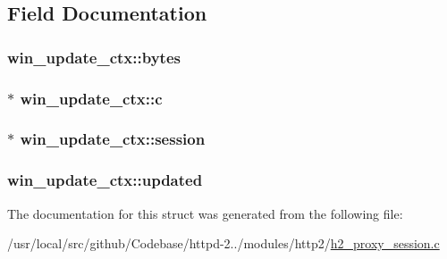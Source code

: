 \subsection{Field Documentation}
\subsubsection[{\texorpdfstring{bytes}{bytes}}]{ win\+\_\+update\+\_\+ctx\+::bytes}\hypertarget{structwin__update__ctx_afa6a82a253225a8e1df7e9de2e55ea28}{}\label{structwin__update__ctx_afa6a82a253225a8e1df7e9de2e55ea28}
\subsubsection[{\texorpdfstring{c}{c}}]{$\ast$ win\+\_\+update\+\_\+ctx\+::c}\hypertarget{structwin__update__ctx_a93823ecffa2e0f63b3d4f07fb62ca406}{}\label{structwin__update__ctx_a93823ecffa2e0f63b3d4f07fb62ca406}
\subsubsection[{\texorpdfstring{session}{session}}]{$\ast$ win\+\_\+update\+\_\+ctx\+::session}\hypertarget{structwin__update__ctx_ae5bfe28fc96917de0833f68cdef78bbc}{}\label{structwin__update__ctx_ae5bfe28fc96917de0833f68cdef78bbc}
\subsubsection[{\texorpdfstring{updated}{updated}}]{ win\+\_\+update\+\_\+ctx\+::updated}\hypertarget{structwin__update__ctx_a5f243df3ee2861c4948343595391bede}{}\label{structwin__update__ctx_a5f243df3ee2861c4948343595391bede}


The documentation for this struct was generated from the following file\+:\begin{DoxyCompactItemize}
\item 
/usr/local/src/github/\+Codebase/httpd-\/2../modules/http2/\hyperlink{h2__proxy__session_8c}{h2\+\_\+proxy\+\_\+session.\+c}\end{DoxyCompactItemize}
